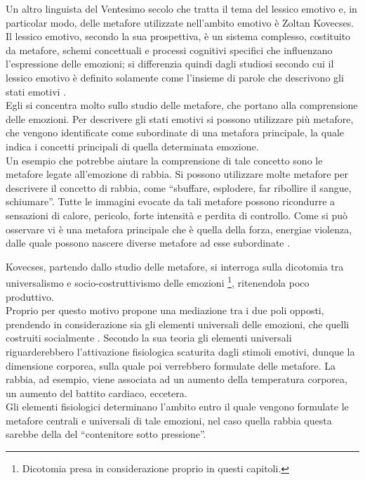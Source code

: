Un altro linguista del Ventesimo secolo che tratta il tema del lessico emotivo e, in particolar modo, delle metafore utilizzate nell'ambito emotivo è Zoltan Kovecses.\\
Il lessico emotivo, secondo la sua prospettiva, è un sistema complesso, costituito da metafore, schemi concettuali e processi cognitivi specifici che influenzano l'espressione delle emozioni; si differenzia quindi dagli studiosi secondo cui il lessico emotivo è definito solamente come l'insieme di parole che descrivono gli stati emotivi \parencite{kovecses_articolo}. \\
Egli si concentra molto sullo studio delle metafore, che portano alla comprensione delle emozioni. Per descrivere gli stati emotivi si possono utilizzare più metafore, che vengono identificate come subordinate di una metafora principale, la quale indica i concetti principali di quella determinata emozione.\\
Un esempio che potrebbe aiutare la comprensione di tale concetto sono le metafore legate all'emozione di rabbia. Si possono utilizzare molte metafore per descrivere il concetto di rabbia, come “sbuffare, esplodere, far ribollire il sangue, schiumare”. Tutte le immagini evocate da tali metafore possono ricondurre a sensazioni di calore, pericolo, forte intensità e perdita di controllo. Come si può osservare vi è una metafora principale che è quella della forza, energia\clearpage e violenza, dalle quale possono nascere diverse metafore ad esse subordinate \parencite{kovecses_articolo}. 

Kovecses, partendo dallo studio delle metafore, si interroga sulla dicotomia tra universalismo e socio-costruttivismo delle emozioni \footnote{Dicotomia presa in considerazione proprio in questi capitoli.}, ritenendola poco produttivo.\\
Proprio per questo motivo propone una mediazione tra i due poli opposti, prendendo in considerazione sia gli elementi universali delle emozioni, che quelli costruiti socialmente \parencite{kovecses_libro_metafore}. Secondo la sua teoria gli elementi universali riguarderebbero l'attivazione fisiologica scaturita dagli stimoli emotivi, dunque la dimensione corporea, sulla quale poi verrebbero formulate delle metafore.
La rabbia, ad esempio, viene associata ad un aumento della temperatura corporea, un aumento del battito cardiaco, eccetera. \\
Gli elementi fisiologici determinano l'ambito entro il quale vengono formulate le metafore centrali e universali di tale emozioni, nel caso quella rabbia questa sarebbe della del “contenitore sotto pressione”.

